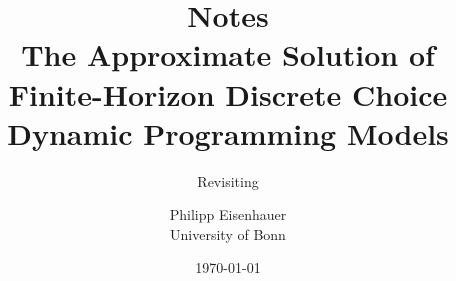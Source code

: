 \title{{\Huge{Notes}}\\\vspace{1.5cm} The Approximate Solution of Finite-Horizon Discrete Choice Dynamic Programming Models}
\subtitle{Revisiting  \citet{Keane.1994}}


\author{Philipp Eisenhauer\\
University of Bonn}

\date{\today}

